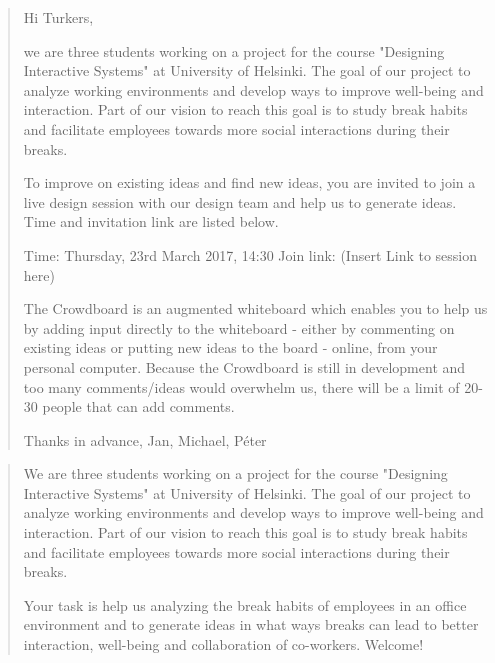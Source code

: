 \documentclass[english]{tktltiki}
\begin{document}
\begin{quote}
Hi Turkers,

we are three students working on a project for the course "Designing Interactive Systems" at University of Helsinki. The goal of our project to analyze working environments and develop ways to improve well-being and interaction. Part of our vision to reach this goal is to study break habits and facilitate employees towards more social interactions during their breaks. 

To improve on existing ideas and find new ideas, you are invited to join a live design session with our design team and help us to generate ideas. Time and invitation link are listed below.

Time: Thursday, 23rd March 2017, 14:30
Join link: (Insert Link to session here)

The Crowdboard is an augmented whiteboard which enables you to help us by adding input directly to the whiteboard - either by commenting on existing ideas or putting new ideas to the board - online, from your personal computer. Because the Crowdboard is still in development and too many comments/ideas would overwhelm us, there will be a limit of 20-30 people that can add comments. 

Thanks in advance,
Jan, Michael, Péter
\end{quote}

\begin{quote}
We are three students working on a project for the course "Designing Interactive Systems" at University of Helsinki. The goal of our project to analyze working environments and develop ways to improve well-being and interaction. Part of our vision to reach this goal is to study break habits and facilitate employees towards more social interactions during their breaks. 

Your task is help us analyzing the break habits of employees in an office environment and to generate ideas in what ways breaks can lead to better interaction, well-being and collaboration of co-workers. Welcome! 
\end{quote}
\end{document}
